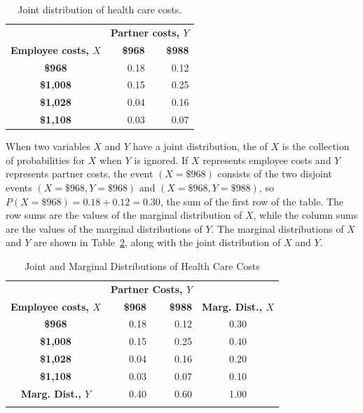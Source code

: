 \begin{table}[h]
\centering
\begin{tabular}{crr}
  \hline
  &   \multicolumn{2}{c}{\textbf{Partner costs, $Y$}} \\
\textbf{Employee costs, $X$} & \textbf{\$968} & \textbf{\$988} \\ 
  \hline
\textbf{\$968} & 0.18 & 0.12 \\ 
 \textbf{\$1,008} & 0.15 & 0.25 \\ 
 \textbf{\$1,028}  & 0.04 & 0.16 \\ 
 \textbf{\$1,108}  & 0.03 & 0.07 \\ 
   \hline
\end{tabular}
\caption{Joint distribution of health care costs.} 
\label{healthExpensesJointDistribution}
\end{table}

When two variables $X$ and $Y$ have a joint distribution, the  of $X$ is the collection of probabilities for $X$ when $Y$ is ignored.  If $X$ represents employee costs and $Y$ represents partner costs, the event $(X = \$968)$ consists of the two  disjoint events $(X = \$968, Y = \$968)$ and $(X = \$968, Y = \$988)$, so $P(X = \$968) = 0.18 + 0.12 = 0.30$, the sum of the first row of the table. The row sums are the values of the marginal distribution of $X$, while the column sums are the values of the marginal distributions of $Y$. The marginal distributions of $X$ and $Y$ are shown in Table~\ref{healthExpensesJointMarginalDistribution}, along with the joint distribution of $X$ and $Y$.

\begin{table}[h]
\centering
\begin{tabular}{crr | c}
  \hline
  &   \multicolumn{2}{c}{\textbf{Partner Costs, $Y$}} & \\
\textbf{Employee costs, $X$} & \textbf{\$968} & \textbf{\$988} &  \textbf{Marg. Dist., $X$} \\ 
  \hline
\textbf{\$968} & 0.18 & 0.12 & 0.30\\ 
 \textbf{\$1,008} & 0.15 & 0.25 & 0.40 \\ 
 \textbf{\$1,028}  & 0.04 & 0.16 & 0.20\\ 
 \textbf{\$1,108}  & 0.03 & 0.07  & 0.10\\ 
   \hline
 \textbf{Marg. Dist., $Y$} & 0.40 & 0.60 & 1.00 \\
 \hline \\
\end{tabular}
\caption{Joint and Marginal Distributions of Health Care Costs} 
\label{healthExpensesJointMarginalDistribution}
\end{table}


